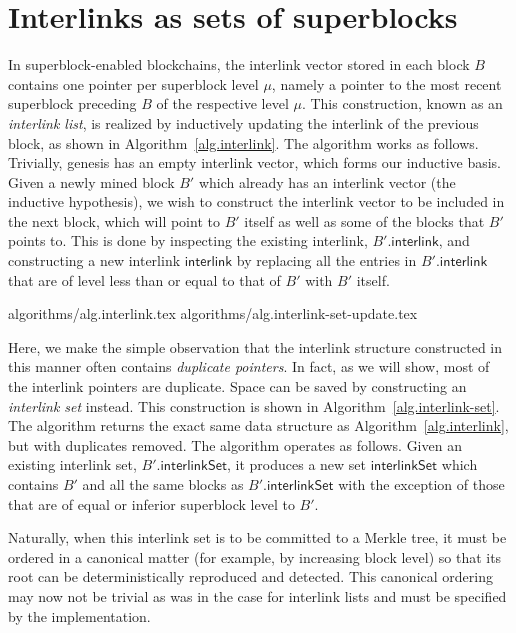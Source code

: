 \section{Interlinks as sets of superblocks}\label{sec.construction}

In superblock-enabled blockchains, the interlink vector stored in each block $B$
contains one pointer per superblock level $\mu$, namely a pointer to the most
recent superblock preceding $B$ of the respective level $\mu$. This
construction, known as an \emph{interlink list}, is realized by inductively
updating the interlink of the previous block, as shown in
Algorithm~\ref{alg.interlink}. The algorithm works as follows. Trivially,
genesis has an empty interlink vector, which forms our inductive basis. Given a
newly mined block $B'$ which already has an interlink vector (the inductive
hypothesis), we wish to construct the interlink vector to be included in the
next block, which will point to $B'$ itself as well as some of the blocks that
$B'$ points to. This is done by inspecting the existing interlink,
$B'.\textsf{interlink}$, and constructing a new interlink $\textsf{interlink}$
by replacing all the entries in $B'.\textsf{interlink}$ that are of level less
than or equal to that of $B'$ with $B'$ itself.

{algorithms/alg.interlink.tex}
{algorithms/alg.interlink-set-update.tex}

Here, we make the simple observation that the interlink structure
constructed in this manner often contains \emph{duplicate pointers}. In fact, as
we will show, most of the interlink pointers are duplicate. Space can be saved
by constructing an \emph{interlink set} instead. This construction is shown in
Algorithm~\ref{alg.interlink-set}. The algorithm returns the exact same data
structure as Algorithm~\ref{alg.interlink}, but with duplicates removed. The
algorithm operates as follows. Given an existing interlink set,
$B'.\textsf{interlinkSet}$, it produces a new set $\textsf{interlinkSet}$ which
contains $B'$ and all the same blocks as $B'.\textsf{interlinkSet}$ with the
exception of those that are of equal or inferior superblock level to $B'$.

Naturally, when this interlink set is to be committed to a Merkle tree, it must
be ordered in a canonical matter (for example, by increasing block level) so
that its root can be deterministically reproduced and detected. This canonical
ordering may now not be trivial as was in the case for interlink lists and must
be specified by the implementation.

